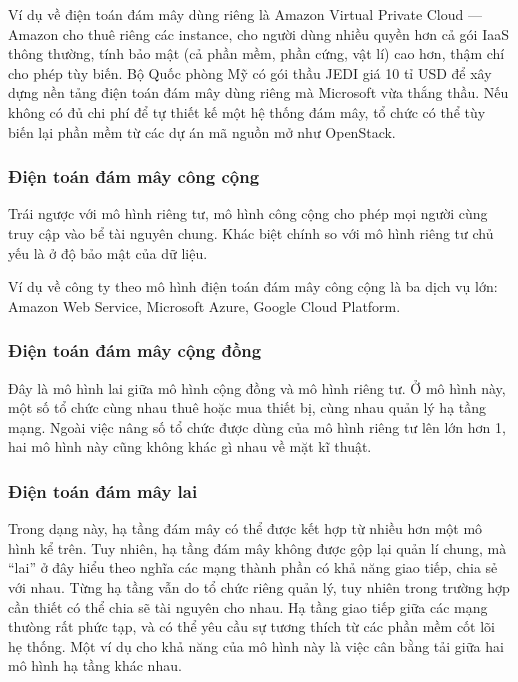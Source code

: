 \documentclass{article}
\begin{document}
Ví dụ về điện toán đám mây dùng riêng là Amazon Virtual Private Cloud --- Amazon
cho thuê riêng các instance, cho người dùng nhiều quyền hơn cả gói IaaS thông
thường, tính bảo mật (cả phần mềm, phần cứng, vật lí) cao hơn, thậm chí cho phép
tùy biến. Bộ Quốc phòng Mỹ có gói thầu JEDI giá 10 tỉ USD để xây dựng nền tảng
điện toán đám mây dùng riêng mà Microsoft vừa thắng thầu. Nếu không có đủ chi
phí để tự thiết kế một hệ thống đám mây, tổ chức có thể tùy biến lại phần mềm từ
các dự án mã nguồn mở như OpenStack.

\subsubsection{Điện toán đám mây công cộng}

Trái ngược với mô hình riêng tư, mô hình công cộng cho phép mọi người cùng truy
cập vào bể tài nguyên chung. Khác biệt chính so với mô hình riêng tư chủ yếu là
ở độ bảo mật của dữ liệu.

Ví dụ về công ty theo mô hình điện toán đám mây công cộng là ba dịch vụ lớn:
Amazon Web Service, Microsoft Azure, Google Cloud Platform.

\subsubsection{Điện toán đám mây cộng đồng}

Đây là mô hình lai giữa mô hình cộng đồng và mô hình riêng tư. Ở mô hình này,
một số tổ chức cùng nhau thuê hoặc mua thiết bị, cùng nhau quản lý hạ tầng mạng.
Ngoài việc nâng số tổ chức được dùng của mô hình riêng tư lên lớn hơn 1, hai mô
hình này cũng không khác gì nhau về mặt kĩ thuật.

\subsubsection{Điện toán đám mây lai}

Trong dạng này, hạ tầng đám mây có thể được kết hợp từ nhiều hơn một mô hình kể
trên. Tuy nhiên, hạ tầng đám mây không được gộp lại quản lí chung, mà ``lai'' ở
đây hiểu theo nghĩa các mạng thành phần có khả năng giao tiếp, chia sẻ với nhau.
Từng hạ tầng vẫn do tổ chức riêng quản lý, tuy nhiên trong trường hợp cần thiết
có thể chia sẽ tài nguyên cho nhau. Hạ tầng giao tiếp giữa các mạng thưòng rất
phức tạp, và có thể yêu cầu sự tương thích từ các phần mềm cốt lõi hẹ thống. Một
ví dụ cho khả năng của mô hình này là việc cân bằng tải giữa hai mô hình hạ tầng
khác nhau.
\end{document}
